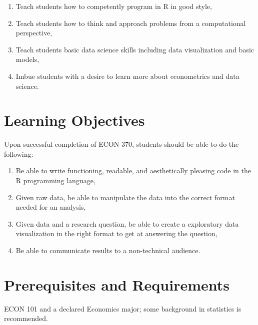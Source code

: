 \documentclass[11pt]{article}
\newcommand{\CourseNum}{370\xspace}         %
\begin{document}
\begin{enumerate}
    \item Teach students how to competently program in R in good style,
    \item Teach students how to think and approach problems from a computational perspective,
    \item Teach students basic data science skills including data visualization and basic models,
    \item Imbue students with a desire to learn more about econometrics and data science.
\end{enumerate}


\section*{Learning Objectives}
Upon successful completion of ECON \CourseNum, students should be able to do the following:

\begin{enumerate}
    \item Be able to write functioning, readable, and aesthetically pleasing code in the R programming language, 
    \item Given raw data, be able to manipulate the data into the correct format needed for an analysis,
    \item Given data and a research question, be able to create a exploratory data visualization in the right format to get at answering the question,
    \item Be able to communicate results to a non-technical audience.
\end{enumerate}


\section*{Prerequisites and Requirements}
ECON 101 and a declared Economics major; some background in statistics is recommended.

\end{document}
